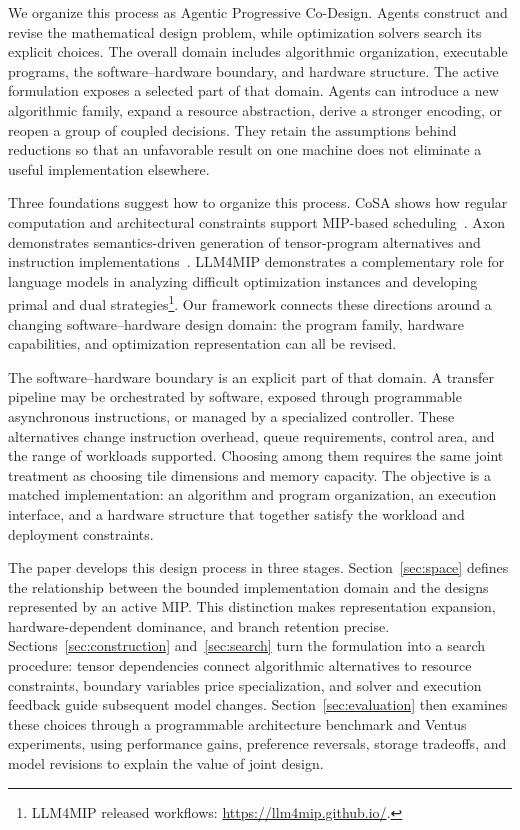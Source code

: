 We organize this process as Agentic Progressive Co-Design. Agents construct and revise the mathematical design problem, while optimization solvers search its explicit choices. The overall domain includes algorithmic organization, executable programs, the software--hardware boundary, and hardware structure. The active formulation exposes a selected part of that domain. Agents can introduce a new algorithmic family, expand a resource abstraction, derive a stronger encoding, or reopen a group of coupled decisions. They retain the assumptions behind reductions so that an unfavorable result on one machine does not eliminate a useful implementation elsewhere.

Three foundations suggest how to organize this process. CoSA shows how regular computation and architectural constraints support MIP-based scheduling~\cite{cosa}. Axon demonstrates semantics-driven generation of tensor-program alternatives and instruction implementations~\cite{axon}. LLM4MIP demonstrates a complementary role for language models in analyzing difficult optimization instances and developing primal and dual strategies\footnote{LLM4MIP released workflows: \url{https://llm4mip.github.io/}.}. Our framework connects these directions around a changing software--hardware design domain: the program family, hardware capabilities, and optimization representation can all be revised.

The software--hardware boundary is an explicit part of that domain. A transfer pipeline may be orchestrated by software, exposed through programmable asynchronous instructions, or managed by a specialized controller. These alternatives change instruction overhead, queue requirements, control area, and the range of workloads supported. Choosing among them requires the same joint treatment as choosing tile dimensions and memory capacity. The objective is a matched implementation: an algorithm and program organization, an execution interface, and a hardware structure that together satisfy the workload and deployment constraints.

The paper develops this design process in three stages. Section~\ref{sec:space} defines the relationship between the bounded implementation domain and the designs represented by an active MIP. This distinction makes representation expansion, hardware-dependent dominance, and branch retention precise. Sections~\ref{sec:construction} and~\ref{sec:search} turn the formulation into a search procedure: tensor dependencies connect algorithmic alternatives to resource constraints, boundary variables price specialization, and solver and execution feedback guide subsequent model changes. Section~\ref{sec:evaluation} then examines these choices through a programmable architecture benchmark and Ventus experiments, using performance gains, preference reversals, storage tradeoffs, and model revisions to explain the value of joint design.

